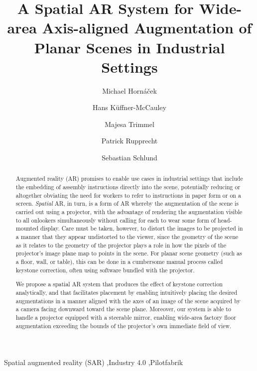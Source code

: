 \documentclass[review]{elsarticle}
\begin{document}
\begin{frontmatter}

\title{A Spatial AR System for Wide-area Axis-aligned Augmentation of Planar Scenes in Industrial Settings} %

\author{Michael Horn\'{a}\v{c}ek}
\author{Hans K\"{u}ffner-McCauley}
\author{Majesa Trimmel}
\author{Patrick Rupprecht}
\author{Sebastian Schlund}
\address{Human Centered Cyber Physical Production and Assembly Systems, Institute for Management Sciences, TU Vienna, Austria}

\begin{abstract}
Augmented reality (AR) promises to enable use cases in industrial settings that include the embedding of assembly instructions directly into the scene, potentially reducing or altogether obviating the need for workers to refer to instructions in paper form or on a screen. \textit{Spatial} AR, in turn, is a form of AR whereby the augmentation of the scene is carried out using a projector, with the advantage of rendering the augmentation visible to all onlookers simultaneously without calling for each to wear some form of head-mounted display. Care must be taken, however, to distort the images to be projected in a manner that they appear undistorted to the viewer, since the geometry of the scene as it relates to the geometry of the projector plays a role in how the pixels of the projector's image plane map to points in the scene. For planar scene geometry (such as a floor, wall, or table), this can be done in a cumbersome manual process called keystone correction, often using software bundled with the projector.

We propose a spatial AR system that produces the effect of keystone correction analytically, and that facilitates placement by enabling intuitively placing the desired augmentations in a manner aligned with the axes of an image of the scene acquired by a camera facing downward toward the scene plane. Moreover, our system is able to handle a projector equipped with a steerable mirror, enabling wide-area factory floor augmentation exceeding the bounds of the projector's own immediate field of view.
\end{abstract}

\begin{keyword}
Spatial augmented reality (SAR) \sep Industry 4.0 \sep Pilotfabrik
\end{keyword}

\end{frontmatter}
\end{document}
